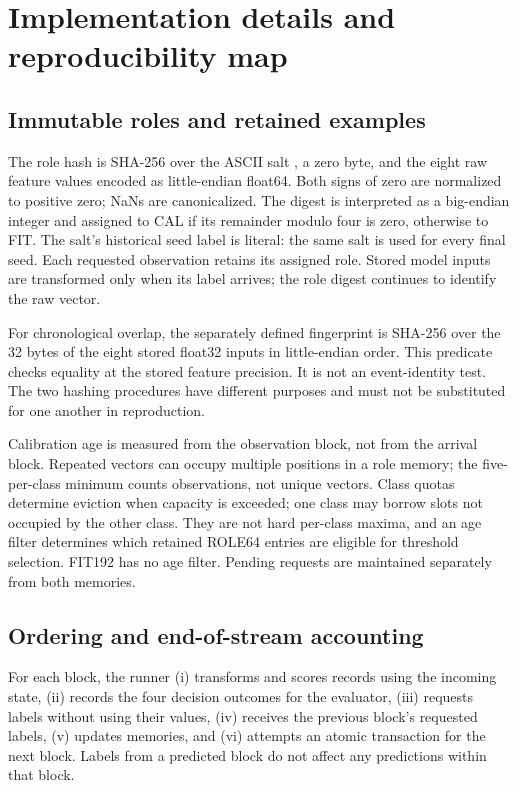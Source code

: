 \section{Implementation details and reproducibility map}
\label{sec:implementation}
\subsection{Immutable roles and retained examples}
The role hash is SHA-256 over the ASCII salt , a zero byte, and the eight raw feature values encoded as little-endian float64. Both signs of zero are normalized to positive zero; NaNs are canonicalized. The digest is interpreted as a big-endian integer and assigned to CAL if its remainder modulo four is zero, otherwise to FIT. The salt's historical seed label is literal: the same salt is used for every final seed. Each requested observation retains its assigned role. Stored model inputs are transformed only when its label arrives; the role digest continues to identify the raw vector.

For chronological overlap, the separately defined fingerprint is SHA-256 over the 32 bytes of the eight stored float32 inputs in little-endian order. This predicate checks equality at the stored feature precision. It is not an event-identity test. The two hashing procedures have different purposes and must not be substituted for one another in reproduction.

Calibration age is measured from the observation block, not from the arrival block. Repeated vectors can occupy multiple positions in a role memory; the five-per-class minimum counts observations, not unique vectors. Class quotas determine eviction when capacity is exceeded; one class may borrow slots not occupied by the other class. They are not hard per-class maxima, and an age filter determines which retained ROLE64 entries are eligible for threshold selection. FIT192 has no age filter. Pending requests are maintained separately from both memories.

\subsection{Ordering and end-of-stream accounting}
For each block, the runner (i) transforms and scores records using the incoming state, (ii) records the four decision outcomes for the evaluator, (iii) requests labels without using their values, (iv) receives the previous block's requested labels, (v) updates memories, and (vi) attempts an atomic transaction for the next block. Labels from a predicted block do not affect any predictions within that block.


